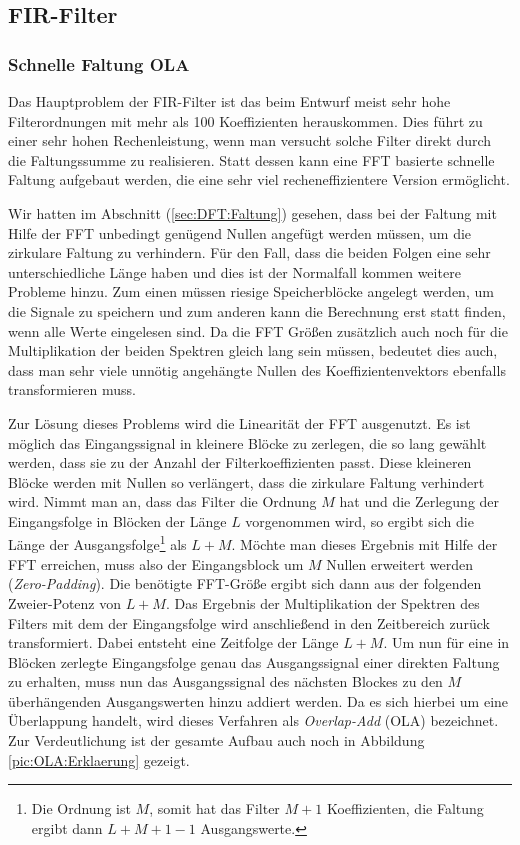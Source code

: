 \subsection{FIR-Filter}
\subsubsection{Schnelle Faltung OLA}
Das Hauptproblem der FIR-Filter ist das beim Entwurf meist sehr hohe Filterordnungen mit mehr als
100 Koeffizienten herauskommen. Dies führt zu einer sehr hohen Rechenleistung, wenn man versucht solche
Filter direkt durch die Faltungssumme zu realisieren. Statt dessen kann eine FFT basierte schnelle
Faltung aufgebaut werden, die eine sehr viel recheneffizientere Version ermöglicht.

Wir hatten im Abschnitt (\ref{sec:DFT:Faltung}) gesehen, dass bei der Faltung mit Hilfe der FFT unbedingt genügend
Nullen angefügt werden müssen, um die zirkulare Faltung zu verhindern.
Für den Fall, dass die beiden Folgen eine sehr unterschiedliche Länge haben und dies
ist der Normalfall kommen weitere Probleme hinzu. Zum einen müssen riesige Speicherblöcke
angelegt werden, um die Signale zu speichern und zum anderen kann die Berechnung erst statt finden,
wenn alle Werte eingelesen sind. Da die FFT Größen zusätzlich auch noch für die Multiplikation der beiden
Spektren gleich lang sein müssen, bedeutet dies auch, dass man sehr viele unnötig angehängte Nullen
des Koeffizientenvektors ebenfalls transformieren muss.

Zur Lösung dieses Problems wird die Linearität der FFT ausgenutzt. Es ist möglich das Eingangssignal
in kleinere Blöcke zu zerlegen, die so lang gewählt werden, dass sie zu der Anzahl der
Filterkoeffizienten passt. Diese kleineren Blöcke werden mit Nullen so verlängert, dass die zirkulare
Faltung verhindert wird. Nimmt man an, dass das Filter die Ordnung $M$ hat und die Zerlegung
der Eingangsfolge in Blöcken der Länge $L$ vorgenommen wird, so ergibt sich die Länge der
Ausgangsfolge\footnote{Die Ordnung ist $M$, somit hat das Filter $M+1$ Koeffizienten, die Faltung ergibt dann
$L+M+1-1$ Ausgangswerte.} als $L+M$. Möchte man dieses Ergebnis mit Hilfe der FFT erreichen, muss
also der Eingangsblock um $M$ Nullen erweitert werden ({\em Zero-Padding}). Die benötigte
FFT-Größe ergibt sich dann aus der folgenden Zweier-Potenz von $L+M$. Das Ergebnis der Multiplikation
der Spektren des Filters mit dem der Eingangsfolge wird anschließend in den Zeitbereich zurück transformiert.
Dabei entsteht eine Zeitfolge der Länge $L+M$. Um nun für eine in Blöcken zerlegte Eingangsfolge
genau das Ausgangssignal einer direkten Faltung zu erhalten, muss nun das Ausgangssignal
des nächsten Blockes zu den $M$ überhängenden Ausgangswerten hinzu addiert werden. Da es sich hierbei
um eine Überlappung handelt, wird dieses Verfahren als {\em Overlap-Add} (OLA) bezeichnet.
Zur Verdeutlichung ist der gesamte Aufbau auch noch in Abbildung \ref{pic:OLA:Erklaerung} gezeigt.

